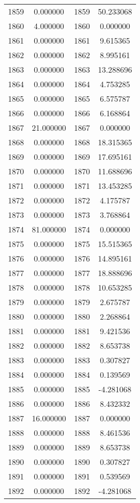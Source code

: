\documentclass[12pt]{article}
\begin{document}
\begin{longtable}{@{}cccc@{}}
1859 & 0.000000 & 1859 & 50.233068 \\
1860 & 4.000000 & 1860 & 0.000000 \\
1861 & 0.000000 & 1861 & 9.615365 \\
1862 & 0.000000 & 1862 & 8.995161 \\
1863 & 0.000000 & 1863 & 13.288696 \\
1864 & 0.000000 & 1864 & 4.753285 \\
1865 & 0.000000 & 1865 & 6.575787 \\
1866 & 0.000000 & 1866 & 6.168864 \\
1867 & 21.000000 & 1867 & 0.000000 \\
1868 & 0.000000 & 1868 & 18.315365 \\
1869 & 0.000000 & 1869 & 17.695161 \\
1870 & 0.000000 & 1870 & 11.688696 \\
1871 & 0.000000 & 1871 & 13.453285 \\
1872 & 0.000000 & 1872 & 4.175787 \\
1873 & 0.000000 & 1873 & 3.768864 \\
1874 & 81.000000 & 1874 & 0.000000 \\
1875 & 0.000000 & 1875 & 15.515365 \\
1876 & 0.000000 & 1876 & 14.895161 \\
1877 & 0.000000 & 1877 & 18.888696 \\
1878 & 0.000000 & 1878 & 10.653285 \\
1879 & 0.000000 & 1879 & 2.675787 \\
1880 & 0.000000 & 1880 & 2.268864 \\
1881 & 0.000000 & 1881 & 9.421536 \\
1882 & 0.000000 & 1882 & 8.653738 \\
1883 & 0.000000 & 1883 & 0.307827 \\
1884 & 0.000000 & 1884 & 0.139569 \\
1885 & 0.000000 & 1885 & -4.281068 \\
1886 & 0.000000 & 1886 & 8.432332 \\
1887 & 16.000000 & 1887 & 0.000000 \\
1888 & 0.000000 & 1888 & 8.461536 \\
1889 & 0.000000 & 1889 & 8.653738 \\
1890 & 0.000000 & 1890 & 0.307827 \\
1891 & 0.000000 & 1891 & 0.539569 \\
1892 & 0.000000 & 1892 & -4.281068 \\

\end{longtable}
\end{document}
